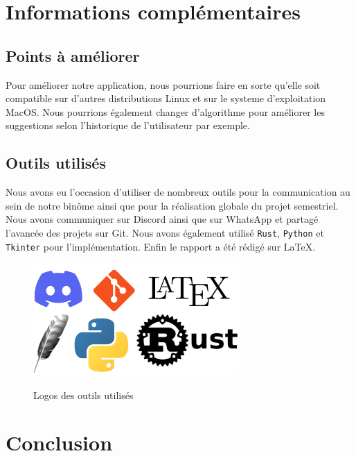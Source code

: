 \documentclass[a4paper, 11pt]{report}
\newcommand{\langage}[1]{\texttt{#1}}
\begin{document}
{\chapter{Informations complémentaires}

\section{Points à améliorer}

Pour améliorer notre application, nous pourrions faire en sorte qu'elle soit compatible sur d'autres distributions Linux et sur le systeme d'exploitation MacOS. Nous pourrions également changer d'algorithme pour améliorer les suggestions selon l'historique de l'utilisateur par exemple.


\section{Outils utilisés}

Nous avons eu l'occasion d'utiliser de  nombreux outils pour la communication au sein de notre binôme ainsi que pour la réalisation globale du projet semestriel. Nous avons communiquer sur Discord ainsi que sur WhatsApp et partagé l'avancée des projets sur Git. Nous avons également utilisé \langage{Rust}, \langage{Python} et \langage{Tkinter} pour l'implémentation. Enfin le rapport a été rédigé sur \LaTeX{}.

\begin{figure}[H]
	\begin{center}
		{\includegraphics[width=0.7\textwidth]{images/outils.png}}
	\end{center}
	\caption{Logos des outils utilisés}
	\label{fig:outils}
\end{figure}
\chapter*{Conclusion}

}
\end{document}
